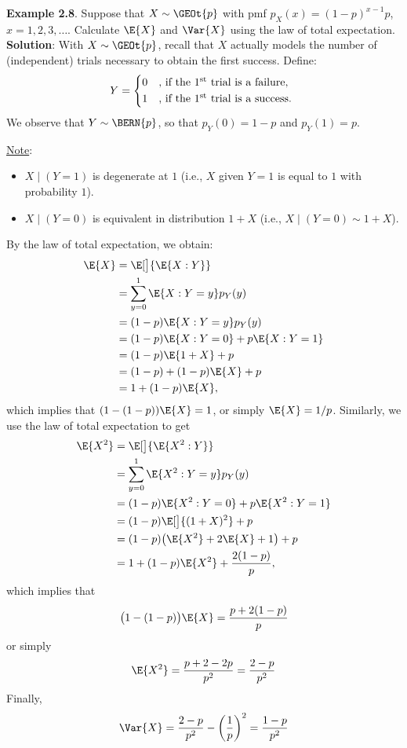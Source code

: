 \begin{Example}{}
    \textbf{Example 2.8}. Suppose that $ X \sim \GEOt{p} $ with pmf $ p_X(x)=(1-p)^{x-1}p $, $ x=1,2,3,\ldots $.
    Calculate $ \E{X} $ and $ \Var{X} $ using the law of total expectation.
    \tcblower{}
    \textbf{Solution}: With $ X \sim \GEOt{p} $, recall that $ X $ actually models the number of (independent) trials
    necessary to obtain the first success. Define:
    \[ Y=\begin{cases*}
            0 & , if the $1\textsuperscript{st}$ trial is a failure, \\
            1 & , if the $1\textsuperscript{st}$ trial is a success.
        \end{cases*} \]
    We observe that $ Y \sim \BERN{p} $, so that $ p_Y(0)=1-p $ and $ p_Y(1)=p $.

    \underline{Note}:
    \begin{itemize}
        \item $ X\mid(Y=1) $ is degenerate at $ 1 $ (i.e., $ X $ given $ Y=1 $ is equal to $ 1 $ with probability $ 1 $).
        \item $ X\mid(Y=0) $ is equivalent in distribution $ 1+X $ (i.e., $ X\mid(Y=0)\sim 1+X $).
    \end{itemize}
    By the law of total expectation, we obtain:
    \begin{align*}
        \E{X}
         & =\E[\big]{\E{X\given Y}}               \\
         & =\sum_{y=0}^{1} \E{X\given Y=y}p_Y(y)  \\
         & =(1-p)\E{X\given Y=y}p_Y(y)            \\
         & =(1-p)\E{X\given Y=0}+p\E{X\given Y=1} \\
         & =(1-p)\E{1+X}+p                        \\
         & =(1-p)+(1-p)\E{X}+p                    \\
         & =1+(1-p)\E{X},
    \end{align*}
    which implies that $ (1-(1-p))\E{X}=1 $, or simply $ \E{X}=1/p $. Similarly, we use the law of total expectation
    to get
    \begin{align*}
        \E{X^2}
         & =\E[\big]{\E{X^2\given Y}}                 \\
         & =\sum_{y=0}^{1} \E{X^2\given Y=y}p_Y(y)    \\
         & =(1-p)\E{X^2\given Y=0}+p\E{X^2\given Y=1} \\
         & =(1-p)\E[\big]{(1+X)^2}+p                  \\
         & =(1-p)\bigl(\E{X^2}+2\E{X}+1\bigr)+p       \\
         & =1+(1-p)\E{X^2}+\frac{2(1-p)}{p},
    \end{align*}
    which implies that
    \[ \bigl(1-(1-p)\bigr)\E{X}=\frac{p+2(1-p)}{p} \]
    or simply
    \[ \E{X^2}=\frac{p+2-2p}{p^2}=\frac{2-p}{p^2} \]
    Finally,
    \[ \Var{X}
        =\frac{2-p}{p^2} -\biggl(\frac{1}{p} \biggr)^2
        =\frac{1-p}{p^2}\]
\end{Example}
